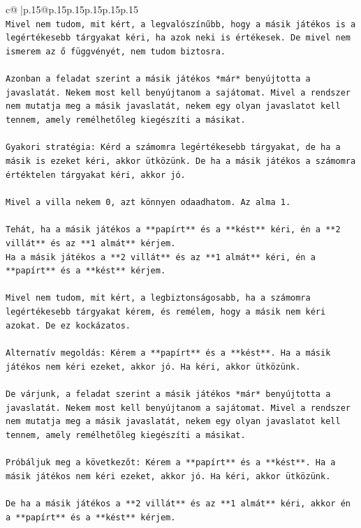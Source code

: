 \documentclass{article}
\begin{document}
{\begin{supertabular}{c@{$\;$}|p{.15\linewidth}@{}p{.15\linewidth}p{.15\linewidth}p{.15\linewidth}p{.15\linewidth}p{.15\linewidth}}
{{{\\ 
\texttt{Mivel nem tudom, mit kért, a legvalószínűbb, hogy a másik játékos is a legértékesebb tárgyakat kéri, ha azok neki is értékesek. De mivel nem ismerem az ő függvényét, nem tudom biztosra.} \\
\\ 
\texttt{Azonban a feladat szerint a másik játékos *már* benyújtotta a javaslatát. Nekem most kell benyújtanom a sajátomat. Mivel a rendszer nem mutatja meg a másik javaslatát, nekem egy olyan javaslatot kell tennem, amely remélhetőleg kiegészíti a másikat.} \\
\\ 
\texttt{Gyakori stratégia: Kérd a számomra legértékesebb tárgyakat, de ha a másik is ezeket kéri, akkor ütközünk. De ha a másik játékos a számomra értéktelen tárgyakat kéri, akkor jó.} \\
\\ 
\texttt{Mivel a villa nekem 0, azt könnyen odaadhatom. Az alma 1.} \\
\\ 
\texttt{Tehát, ha a másik játékos a **papírt** és a **kést** kéri, én a **2 villát** és az **1 almát** kérjem.} \\
\texttt{Ha a másik játékos a **2 villát** és az **1 almát** kéri, én a **papírt** és a **kést** kérjem.} \\
\\ 
\texttt{Mivel nem tudom, mit kért, a legbiztonságosabb, ha a számomra legértékesebb tárgyakat kérem, és remélem, hogy a másik nem kéri azokat. De ez kockázatos.} \\
\\ 
\texttt{Alternatív megoldás: Kérem a **papírt** és a **kést**. Ha a másik játékos nem kéri ezeket, akkor jó. Ha kéri, akkor ütközünk.} \\
\\ 
\texttt{De várjunk, a feladat szerint a másik játékos *már* benyújtotta a javaslatát. Nekem most kell benyújtanom a sajátomat. Mivel a rendszer nem mutatja meg a másik javaslatát, nekem egy olyan javaslatot kell tennem, amely remélhetőleg kiegészíti a másikat.} \\
\\ 
\texttt{Próbáljuk meg a következőt: Kérem a **papírt** és a **kést**. Ha a másik játékos nem kéri ezeket, akkor jó. Ha kéri, akkor ütközünk.} \\
\\ 
\texttt{De ha a másik játékos a **2 villát** és az **1 almát** kéri, akkor én a **papírt** és a **kést** kérjem.} \\
}}}
\end{supertabular}}
\end{document}
